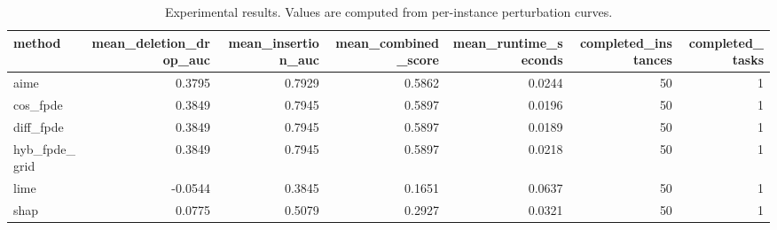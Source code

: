 \begin{table}[t]
\caption{Experimental results. Values are computed from per-instance perturbation curves.}
\label{tab:main_results_computed}
\centering
\begin{tabular}{lrrrrrr}
\toprule
method & mean\_deletion\_drop\_auc & mean\_insertion\_auc & mean\_combined\_score & mean\_runtime\_seconds & completed\_instances & completed\_tasks \\
\midrule
aime & 0.3795 & 0.7929 & 0.5862 & 0.0244 & 50 & 1 \\
cos\_fpde & 0.3849 & 0.7945 & 0.5897 & 0.0196 & 50 & 1 \\
diff\_fpde & 0.3849 & 0.7945 & 0.5897 & 0.0189 & 50 & 1 \\
hyb\_fpde\_grid & 0.3849 & 0.7945 & 0.5897 & 0.0218 & 50 & 1 \\
lime & -0.0544 & 0.3845 & 0.1651 & 0.0637 & 50 & 1 \\
shap & 0.0775 & 0.5079 & 0.2927 & 0.0321 & 50 & 1 \\
\bottomrule
\end{tabular}

\end{table}
